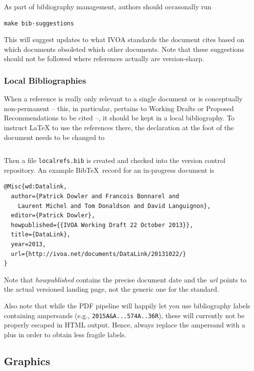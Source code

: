\documentclass[11pt,a4paper]{ivoa}
\newcommand{\BibTeX}{Bib\TeX}
\begin{document}
As part of bibliography management, authors should occasonally run

\begin{lstlisting}
make bib-suggestions
\end{lstlisting}

\noindent This will suggest updates to what IVOA standards the document cites
based on which documents obsoleted which other documents.  Note that
these suggestions should not be followed where references actually are
version-sharp.

\subsubsection{Local Bibliographies}

When a reference is really only relevant to a single document or is
conceptually non-permanent -- this, in particular, pertains to Working
Drafts or Proposed Recommendations to be cited --, it should be kept in a
local bibliography.  To instruct \LaTeX{} to use the references there,
the declaration at the foot of the document needs to be
changed to

\begin{lstlisting}

\end{lstlisting}

Then a file \texttt{localrefs.bib} is created and checked into the
version control repository.  An example \BibTeX\ record for an
in-progress document is

\begin{lstlisting}
@Misc{wd:Datalink,
  author={Patrick Dowler and Francois Bonnarel and
    Laurent Michel and Tom Donaldson and David Languignon},
  editor={Patrick Dowler},
  howpublished={{IVOA Working Draft 22 October 2013}},
  title={DataLink},
  year=2013,
  url={http://ivoa.net/documents/DataLink/20131022/}
}
\end{lstlisting}

Note that \emph{howpublished} contains the precise document date and the
\emph{url} points to the actual versioned landing page, not the generic
one for the standard.

Also note that while the PDF pipeline will happily let you use
bibliography labels containing ampersands (e.g.,
\verb|2015A&A...574A..36R|), these will currently not be properly
escaped in HTML output.  Hence, always replace the ampersand with a plus
in order to obtain less fragile labels.

\subsection{Graphics}
\end{document}
